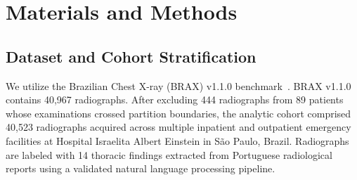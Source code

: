 \documentclass[preprint,12pt]{elsarticle}
\begin{document}
\section{Materials and Methods}

\subsection{Dataset and Cohort Stratification}
We utilize the Brazilian Chest X-ray (BRAX) v1.1.0 benchmark~\cite{reis2022brax}. BRAX v1.1.0 contains 40,967 radiographs. After excluding 444 radiographs from 89 patients whose examinations crossed partition boundaries, the analytic cohort comprised 40,523 radiographs acquired across multiple inpatient and outpatient emergency facilities at Hospital Israelita Albert Einstein in S\~ao Paulo, Brazil. Radiographs are labeled with 14 thoracic findings extracted from Portuguese radiological reports using a validated natural language processing pipeline.
\end{document}
